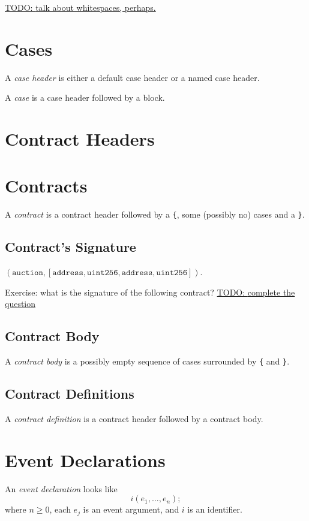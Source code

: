 \documentclass{book}
\newcommand{\todo}[1]{\underline{TODO: {#1}}}
\begin{document}
\todo{talk about whitespaces, perhaps.}

\section{Cases}

A \textit{case header} is either a default case header or a named case header.

A \textit{case} is a case header followed by a block.


\section{Contract Headers}

\section{Contracts}

A \textit{contract} is a contract header followed by a \texttt{\{}, some (possibly no) cases and a \texttt{\}}.

\subsection{Contract's Signature}

$(\mathtt{auction}, [\mathtt{address}, \mathtt{uint256}, \mathtt{address}, \mathtt{uint256}])$.

Exercise: what is the signature of the following contract?
\todo{complete the question}

\subsection{Contract Body}

A \textit{contract body} is a possibly empty sequence of cases surrounded by \texttt{\{} and \texttt{\}}.

\subsection{Contract Definitions}

A \textit{contract definition} is a contract header followed by a contract body.

\section{Event Declarations}

An \textit{event declaration} looks like
\[
 i(e_1, \ldots, e_n);
\]
where $n \ge 0$, each $e_j$ is an event argument, and $i$ is an identifier.
\end{document}
